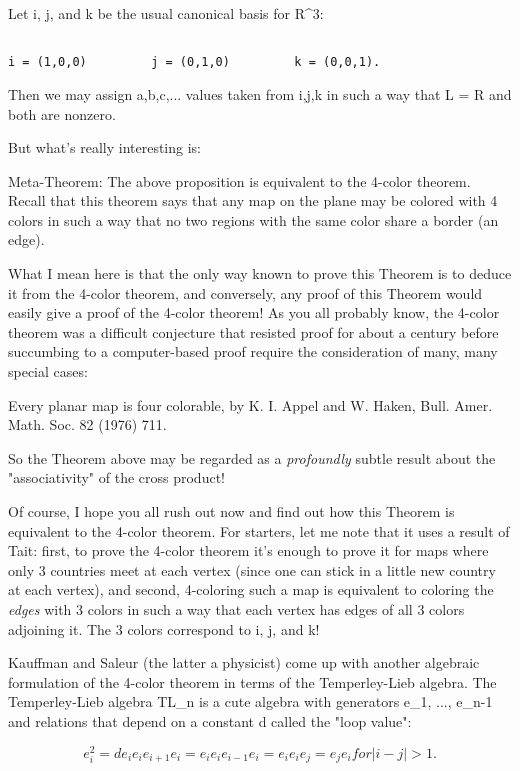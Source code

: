 Let i, j, and k be the usual canonical basis for R^3:


\begin{verbatim}

i = (1,0,0)         j = (0,1,0)         k = (0,0,1).
\end{verbatim}
    

Then we may assign a,b,c,... values taken from {i,j,k} in such a way 
that L = R and both are nonzero.

But what's really interesting is:

Meta-Theorem: The above proposition is equivalent to the 4-color
theorem.  Recall that this theorem says that any map on the plane may be
colored with 4 colors in such a way that no two regions with the same
color share a border (an edge).  

What I mean here is that the only way known to prove this Theorem is to
deduce it from the 4-color theorem, and conversely, any proof of this
Theorem would easily give a proof of the 4-color theorem!  As you all
probably know, the 4-color theorem was a difficult conjecture that
resisted proof for about a century before succumbing to a computer-based
proof require the consideration of many, many special cases:

Every planar map is four colorable, by K. I. Appel and W. Haken, Bull.
Amer. Math. Soc. 82 (1976) 711.

So the Theorem above may be regarded as a \emph{profoundly} subtle result
about the "associativity" of the cross product!

Of course, I hope you all rush out now and find out how this Theorem is
equivalent to the 4-color theorem.  For starters, let me note that it
uses a result of Tait: first, to prove the 4-color theorem it's enough
to prove it for maps where only 3 countries meet at each vertex (since
one can stick in a little new country at each vertex), and second,
4-coloring such a map is equivalent to coloring the \emph{edges} with 3
colors in such a way that each vertex has edges of all 3 colors
adjoining it.  The 3 colors correspond to i, j, and k!

Kauffman and Saleur (the latter a physicist) come up with another algebraic
formulation of the 4-color theorem in terms of the Temperley-Lieb
algebra.  The Temperley-Lieb algebra TL_n is a cute algebra with
generators e_1, ..., e_{n-1} and relations that depend on a constant d
called the "loop value":


$$

e_i^2 = de_i
e_i e_{i+1} e_i = e_i
e_i e_{i-1} e_i = e_i
e_i e_j = e_j e_i     for |i-j| > 1.
$$
    

